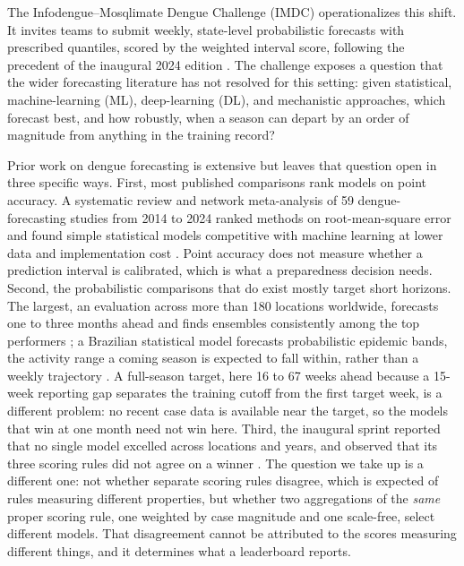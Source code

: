 \documentclass[11pt]{article}
\begin{document}
The Infodengue--Mosqlimate Dengue Challenge (IMDC) operationalizes this shift. It invites teams to
submit weekly, state-level probabilistic forecasts with prescribed quantiles, scored by the weighted
interval score, following the precedent of the inaugural 2024 edition \citep{araujo2026}. The
challenge exposes a question that the wider forecasting literature has not resolved for this
setting: given statistical, machine-learning (ML), deep-learning (DL), and mechanistic approaches,
which forecast best, and how robustly, when a season can depart by an order of magnitude from
anything in the training record?

Prior work on dengue forecasting is extensive but leaves that question open in three specific
ways. First, most published comparisons rank models on point accuracy. A systematic review and
network meta-analysis of 59 dengue-forecasting studies from 2014 to 2024 ranked methods on
root-mean-square error and found simple statistical models competitive with machine learning at
lower data and implementation cost \citep{benjarattanaporn2026}. Point accuracy does not measure
whether a prediction interval is calibrated, which is what a preparedness decision needs. Second,
the probabilistic comparisons that do exist mostly target short horizons. The largest, an
evaluation across more than 180 locations worldwide, forecasts one to three months ahead
and finds ensembles consistently among the top performers \citep{wu2025}; a Brazilian statistical
model forecasts probabilistic epidemic bands, the activity range a coming season is expected to
fall within, rather than a weekly trajectory \citep{freitas2025}. A full-season target, here 16 to
67 weeks ahead because a 15-week reporting gap separates the training cutoff from the first target
week, is a different problem: no recent case data is available near the target, so the models that
win at one month need not win here. Third, the inaugural sprint reported that no single model
excelled across locations and years, and observed that its three scoring rules did not agree on a
winner \citep{araujo2026}. The question we take up is a different one: not whether separate scoring
rules disagree, which is expected of rules measuring different properties, but whether two
aggregations of the \emph{same} proper scoring rule, one weighted by case magnitude and one
scale-free, select different models. That disagreement cannot be attributed to the scores measuring
different things, and it determines what a leaderboard reports.
\end{document}
